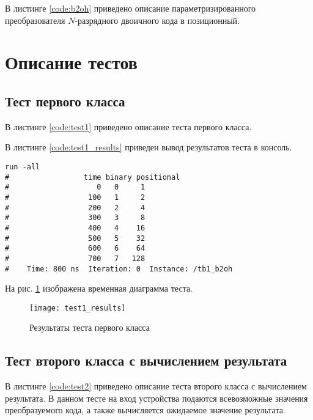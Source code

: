 В листинге \ref{code:b2oh} приведено описание параметризированного преобразователя $N$-разрядного двоичного кода в позиционный.


\section{Описание тестов}
\label{sec:tests}

\subsection{Тест первого класса}

В листинге \ref{code:test1} приведено описание теста первого класса.


В листинге \ref{code:test1_results} приведен вывод результатов теста в консоль.
\begin{lstlisting}[caption=Результаты теста первого класса, label=code:test1_results, style=console]
run -all
# 		          time binary positional
#                    0   0     1
#                  100   1     2
#                  200   2     4
#                  300   3     8
#                  400   4    16
#                  500   5    32
#                  600   6    64
#                  700   7   128
#    Time: 800 ns  Iteration: 0  Instance: /tb1_b2oh
\end{lstlisting}

На рис. \ref{fig:test1_results} изображена временная диаграмма теста.
\begin{figure}[H]
	\begin{center}
		\texttt{[image: test1\_results]}
		\caption{Результаты теста первого класса}
		\label{fig:test1_results}
	\end{center}
\end{figure}
\vspace{-1cm}

\subsection{Тест второго класса с вычислением результата}

В листинге \ref{code:test2} приведено описание теста второго класса с вычислением результата. В данном тесте на вход устройства подаются всевозможные значения преобразуемого кода, а также вычисляется ожидаемое значение результата.


